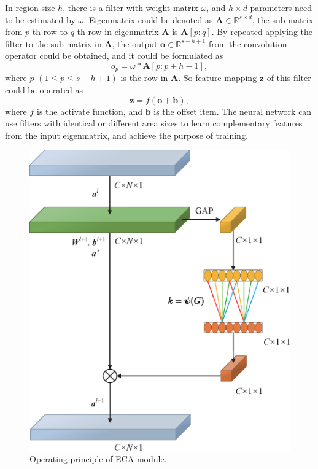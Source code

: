 \documentclass[conference]{IEEEtran}
\begin{document}
 In region size $h$, there is a filter with weight matrix $\omega$, and $h \times d$ parameters need to be estimated by $\omega$. Eigenmatrix could be denoted as $\boldsymbol{A} \in \mathbb{R}^{s \times d}$, the sub-matrix from $p$-th row to $q$-th row in eigenmatrix $\boldsymbol{A}$ is $\boldsymbol{A}[p : q]$. By repeated applying the filter to the sub-matrix in $\boldsymbol{A}$, the output $\boldsymbol{o} \in \mathbb{R}^{s - h + 1}$ from the convolution operator could be obtained, and it could be formulated as
\begin{equation}
	o_{p}=\omega * \boldsymbol{A}[{p}: {p}+{h}-1],
\end{equation}
where $p$ $(1 \leq {p} \leq {s} - {h} + 1)$ is the row in $\boldsymbol{A}$. So feature mapping $\boldsymbol{z}$ of this filter could be operated as
\begin{equation}
	\boldsymbol{z}=f(\boldsymbol{o}+\boldsymbol{b}),
\end{equation}
where $f$ is the activate function, and $\boldsymbol{b}$ is the offset item. The neural network can use filters with identical or different area sizes to learn complementary features from the input eigenmatrix, and achieve the purpose of training.


\begin{figure}[tbp]
	\centerline{\includegraphics[scale=0.5]{figure-3-01.eps}}
	\caption{Operating principle of ECA module.}%
\end{figure}
\end{document}
